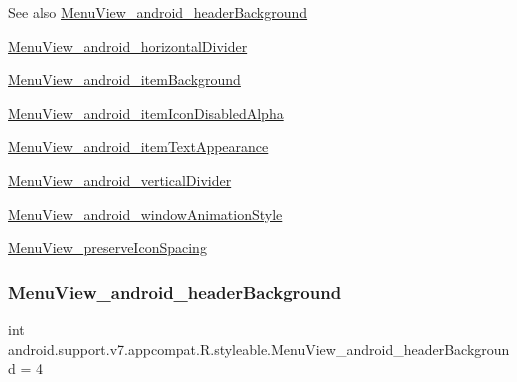 \begin{DoxySeeAlso}{See also}
\hyperlink{classandroid_1_1support_1_1v7_1_1appcompat_1_1R_1_1styleable_a9c0eeec4e3e6054bad955d013d985d26}{Menu\+View\+\_\+android\+\_\+header\+Background} 

\hyperlink{classandroid_1_1support_1_1v7_1_1appcompat_1_1R_1_1styleable_a8fc0d8471f20ad27ea31f2f6e91a7c4e}{Menu\+View\+\_\+android\+\_\+horizontal\+Divider} 

\hyperlink{classandroid_1_1support_1_1v7_1_1appcompat_1_1R_1_1styleable_ab077ea4deb3c1bc7536b4f0339e92b0a}{Menu\+View\+\_\+android\+\_\+item\+Background} 

\hyperlink{classandroid_1_1support_1_1v7_1_1appcompat_1_1R_1_1styleable_afb79e93a74e10b7276373c5811009513}{Menu\+View\+\_\+android\+\_\+item\+Icon\+Disabled\+Alpha} 

\hyperlink{classandroid_1_1support_1_1v7_1_1appcompat_1_1R_1_1styleable_a6a5f97c5e220a37019516cf6bff0ccb8}{Menu\+View\+\_\+android\+\_\+item\+Text\+Appearance} 

\hyperlink{classandroid_1_1support_1_1v7_1_1appcompat_1_1R_1_1styleable_aaa05173a2f852ccfca3b7df5fefadbdd}{Menu\+View\+\_\+android\+\_\+vertical\+Divider} 

\hyperlink{classandroid_1_1support_1_1v7_1_1appcompat_1_1R_1_1styleable_abfc971adc049e070d2cbed01ebde0129}{Menu\+View\+\_\+android\+\_\+window\+Animation\+Style} 

\hyperlink{classandroid_1_1support_1_1v7_1_1appcompat_1_1R_1_1styleable_a8b0fb09a515b636405db851879e9fb7d}{Menu\+View\+\_\+preserve\+Icon\+Spacing} 
\end{DoxySeeAlso}
\mbox{\label{classandroid_1_1support_1_1v7_1_1appcompat_1_1R_1_1styleable_a9c0eeec4e3e6054bad955d013d985d26}} 
\subsubsection{\texorpdfstring{Menu\+View\+\_\+android\+\_\+header\+Background}{MenuView\_android\_headerBackground}}
{\footnotesize\ttfamily int android.\+support.\+v7.\+appcompat.\+R.\+styleable.\+Menu\+View\+\_\+android\+\_\+header\+Background = 4\hspace{0.3cm}{\ttfamily [static]}}

